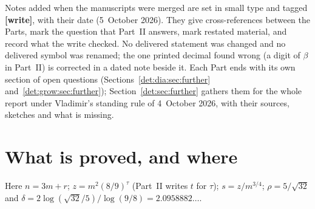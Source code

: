 \documentclass[11pt,letterpaper]{article}
\numberwithin{equation}{section}
\theoremstyle{definition}\newtheorem{definition}[theorem]{Definition}
\theoremstyle{remark}\newtheorem{remark}[theorem]{Remark}
\begin{document}
Notes added when the manuscripts were merged are set in small type and tagged \textbf{[write]}, with their date (5~October 2026). They give cross-references between the Parts, mark the question that Part~II answers, mark restated material, and record what the write checked. No delivered statement was changed and no delivered symbol was renamed; the one printed decimal found wrong (a digit of $\beta$ in Part~II) is corrected in a dated note beside it. Each Part ends with its own section of open questions (Sections~\ref{det:dia:sec:further} and~\ref{det:grow:sec:further}); Section~\ref{det:sec:further} gathers them for the whole report under Vladimir's standing rule of 4~October 2026, with their sources, sketches and what is missing.

\section*{What is proved, and where}\label{det:sec:status}
Here $n=3m+r$; $z=m^2(8/9)^\tau$ (Part~II writes $t$ for $\tau$); $s=z/m^{3/4}$; $\rho=5/\sqrt{32}$ and $\delta=2\log(\sqrt{32}/5)/\log(9/8)=2.0958882\ldots$.
\end{document}
